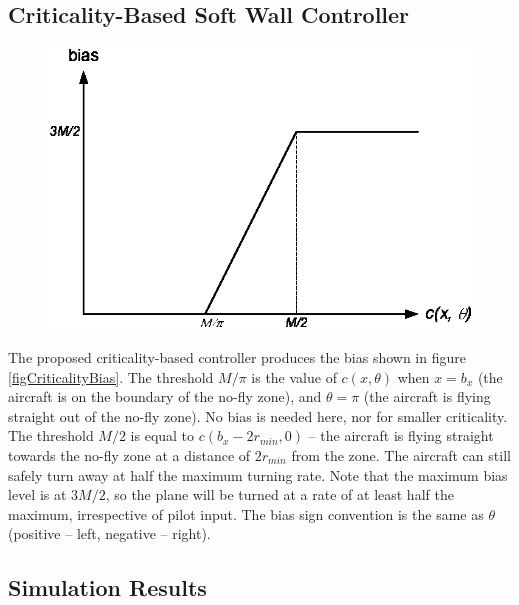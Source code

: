 \documentclass[11pt]{article}
\begin{document}
\subsection{Criticality-Based Soft Wall Controller}

\begin{figure}[btp]
\centering
\includegraphics{criticalityBias.eps}
\end{figure}

The proposed criticality-based controller produces the bias shown in
figure \ref{figCriticalityBias}.  The threshold $M/\pi$ is the value
of $c(x, \theta)$ when $x = b_{x}$ (the aircraft is on the boundary of
the no-fly zone), and $\theta = \pi$ (the aircraft is flying straight
out of the no-fly zone). No bias is needed here, nor for smaller
criticality.  The threshold $M/2$ is equal to $c(b_{x}-2r_{min}, 0)$
-- the aircraft is flying straight towards the no-fly zone at a
distance of $2r_{min}$ from the zone.  The aircraft can still safely
turn away at half the maximum turning rate. Note that the maximum bias
level is at $3M/2$, so the plane will be turned at a rate of at least
half the maximum, irrespective of pilot input. The bias sign convention
is the same as $\theta$ (positive -- left, negative -- right).


\subsection{Simulation Results}
\end{document}

